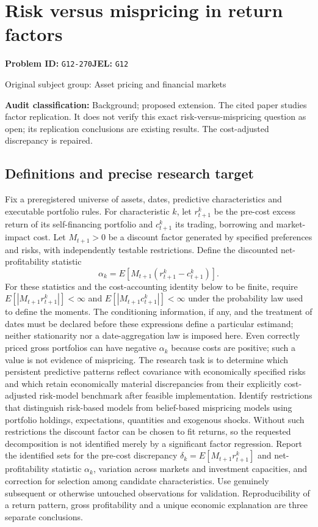 \documentclass[11pt,a4paper]{article}
\begin{document}
\section*{Risk versus mispricing in return factors}
\textbf{Problem ID:} \texttt{G12-270}\quad \textbf{JEL:} \texttt{G12}\par
\label{problem:OP-0314}
{\sffamily\small\color{muted}Original subject group: Asset pricing and financial markets\par}
\label{definitions:problem:30007596}
\textbf{Audit classification:} Background; proposed extension. The cited paper studies factor replication. It does not verify this exact risk-versus-mispricing question as open; its replication conclusions are existing results. The cost-adjusted discrepancy is repaired.
\subsection*{Definitions and precise research target}
Fix a preregistered universe of assets, dates, predictive characteristics and executable portfolio rules. For characteristic \(k\), let \(r^k_{t+1}\) be the pre-cost excess return of its self-financing portfolio and \(c^k_{t+1}\) its trading, borrowing and market-impact cost. Let \(M_{t+1}>0\) be a discount factor generated by specified preferences and risks, with independently testable restrictions. Define the discounted net-profitability statistic
\[\alpha_k=E[M_{t+1}(r^k_{t+1}-c^k_{t+1})].\]
For these statistics and the cost-accounting identity below to be finite, require \(E[|M_{t+1}r^k_{t+1}|]<\infty\) and \(E[|M_{t+1}c^k_{t+1}|]<\infty\) under the probability law used to define the moments. The conditioning information, if any, and the treatment of dates must be declared before these expressions define a particular estimand; neither stationarity nor a date-aggregation law is imposed here.
Even correctly priced gross portfolios can have negative \(\alpha_k\) because costs are positive; such a value is not evidence of mispricing. The research task is to determine which persistent predictive patterns reflect covariance with economically specified risks and which retain economically material discrepancies from their explicitly cost-adjusted risk-model benchmark after feasible implementation. Identify restrictions that distinguish risk-based models from belief-based mispricing models using portfolio holdings, expectations, quantities and exogenous shocks. Without such restrictions the discount factor can be chosen to fit returns, so the requested decomposition is not identified merely by a significant factor regression. Report the identified sets for the pre-cost discrepancy \(\delta_k=E[M_{t+1}r^k_{t+1}]\) and net-profitability statistic \(\alpha_k\), variation across markets and investment capacities, and correction for selection among candidate characteristics. Use genuinely subsequent or otherwise untouched observations for validation. Reproducibility of a return pattern, gross profitability and a unique economic explanation are three separate conclusions.
\end{document}
